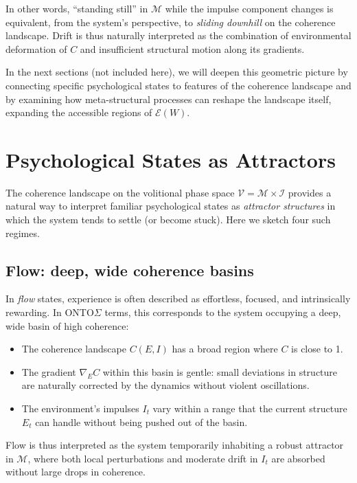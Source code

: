 \documentclass[12pt,a4paper]{report}
\newcommand{\Will}{W}
\begin{document}
In other words, ``standing still'' in \(\mathcal{M}\) while the impulse component changes is equivalent, from the system's perspective, to \emph{sliding downhill} on the coherence landscape. Drift is thus naturally interpreted as the combination of environmental deformation of \(C\) and insufficient structural motion along its gradients.

In the next sections (not included here), we will deepen this geometric picture by connecting specific psychological states to features of the coherence landscape and by examining how meta-structural processes can reshape the landscape itself, expanding the accessible regions of \(\mathcal{E}(\Will)\).


\section{Psychological States as Attractors}

The coherence landscape on the volitional phase space \(\mathcal{V} = \mathcal{M} \times \mathcal{I}\) provides a natural way to interpret familiar psychological states as \emph{attractor structures} in which the system tends to settle (or become stuck). Here we sketch four such regimes.

\subsection*{Flow: deep, wide coherence basins}

In \emph{flow} states, experience is often described as effortless, focused, and intrinsically rewarding. In ONTO$\Sigma$ terms, this corresponds to the system occupying a deep, wide basin of high coherence:

\begin{itemize}[leftmargin=2em]
    \item The coherence landscape \(C(E, I)\) has a broad region where \(C\) is close to 1.
    \item The gradient \(\nabla_E C\) within this basin is gentle: small deviations in structure are naturally corrected by the dynamics without violent oscillations.
    \item The environment's impulses \(I_t\) vary within a range that the current structure \(E_t\) can handle without being pushed out of the basin.
\end{itemize}

Flow is thus interpreted as the system temporarily inhabiting a robust attractor in \(\mathcal{M}\), where both local perturbations and moderate drift in \(I_t\) are absorbed without large drops in coherence.
\end{document}

